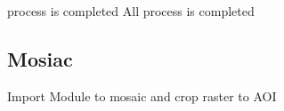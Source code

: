 \documentclass[letterpaper,10pt]{sphinxmanual}
\begin{document}
\begin{sphinxVerbatim}[commandchars=\\\{\}]
process is completed
All process is completed
\end{sphinxVerbatim}

\begin{sphinxVerbatim}[commandchars=\\\{\}]

\end{sphinxVerbatim}

\sphinxstepscope


\subsection{Mosiac}
\label{\detokenize{notebooks/Mosaic_Crop:Mosiac}}\label{\detokenize{notebooks/Mosaic_Crop::doc}}
\sphinxAtStartPar
Import Module to mosaic and crop raster to AOI
\end{document}
